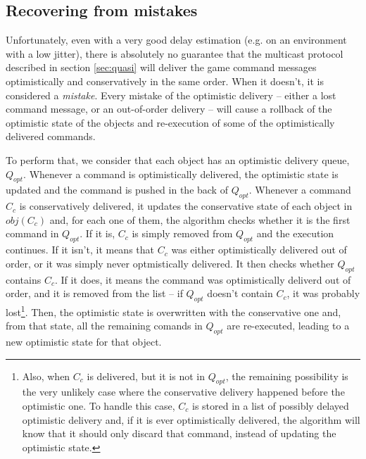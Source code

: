\documentclass[times, 10pt]{article}
\begin{document}

\subsection{Recovering from mistakes}

Unfortunately, even with a very good delay estimation (e.g. on an environment with a low jitter), there is absolutely no guarantee that the multicast protocol described  in section \ref{sec:quasi} will deliver the game command messages optimistically and conservatively in the same order. When it doesn't, it is considered a \emph{mistake}. Every mistake of the optimistic delivery -- either a lost command message, or an out-of-order delivery -- will cause a rollback of the optimistic state of the objects and re-execution of some of the optimistically delivered commands.

To perform that, we consider that each object has an optimistic delivery queue, $Q_{opt}$. Whenever a command is optimistically delivered, the optimistic state is updated and the command is pushed in the back of $Q_{opt}$. Whenever a command $C_c$ is conservatively delivered, it updates the conservative state of each object in $obj(C_c)$ and, for each one of them, the algorithm checks whether it is the first command in $Q_{opt}$. If it is, $C_c$ is simply removed from $Q_{opt}$ and the execution continues. If it isn't, it means that $C_c$ was either optimistically delivered out of order, or it was simply never optmistically delivered. It then checks whether $Q_{opt}$ contains $C_c$. If it does, it means the command was optimistically deliverd out of order, and it is removed from the list -- if $Q_{opt}$ doesn't contain $C_c$, it was probably lost\footnote{Also, when $C_c$ is delivered, but it is not in $Q_{opt}$, the remaining possibility is the very unlikely case where the conservative delivery happened before the optimistic one. To handle this case, $C_c$ is stored in a list of possibly delayed optimistic delivery and, if it is ever optimistically delivered, the algorithm will know that it should only discard that command, instead of updating the optimistic state.}. Then, the optimistic state is overwritten with the conservative one and, from that state, all the remaining comands in $Q_{opt}$ are re-executed, leading to a new optimistic state for that object.


%
%
\end{document}

